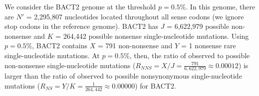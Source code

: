 We consider the BACT2 genome at the threshold $p = 0.5\%$.
%
In this genome, there are $N'$ = 2,295,807 nucleotides
located throughout all sense codons (we ignore stop codons in the reference genome).
%
BACT2 has $J$ = 6,622,979 possible non-nonsense and
$K$ = 264,442 possible nonsense single-nucleotide mutations.
%
Using $p = 0.5\%$, BACT2 contains
$X$ = 791 non-nonsense and
$Y$ = 1 nonsense rare single-nucleotide mutations.
%
At $p = 0.5\%$, then, the ratio of observed to possible non-nonsense single-nucleotide mutations
($R_{NNS} = X / J = \frac{791}{6,622,979}
\approx 0.00012$)
is larger than the ratio of observed to possible nonsynonymous single-nucleotide mutations
($R_{NS} = Y / K = \frac{1}{264,442}
\approx 0.00000$)
for BACT2.
\endinput